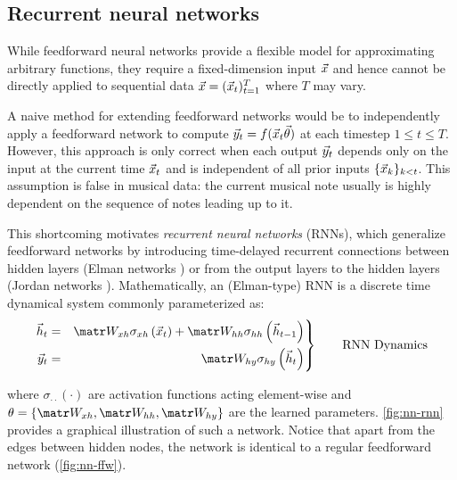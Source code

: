 \subsection{Recurrent neural networks}


While feedforward neural networks provide a flexible model for approximating
arbitrary functions, they require a fixed-dimension input $\vec{x}$ and hence
cannot be directly applied to sequential data $\vec{x} = (\vec{x}_t)_{t=1}^T$ where $T$ may
vary.

A naive method for extending feedforward networks would be to independently
apply a feedforward network to compute $\vec{y}_t = f(\vec{x}_t \vec{\theta})$ at each timestep
$1 \leq t \leq T$. However, this approach is only correct when each output
$\vec{y}_t$ depends only on the input at the current time $\vec{x}_t$ and is independent of
all prior inputs $\{\vec{x}_k\}_{k < t}$. This assumption is false in musical data:
the current musical note usually is highly dependent on the sequence of notes
leading up to it.

This shortcoming motivates \emph{recurrent neural networks} (RNNs), which
generalize feedforward networks by introducing time-delayed recurrent
connections between hidden layers (Elman networks \citep{elman1990finding}) or
from the output layers to the hidden layers (Jordan networks
\citep{jordan1997serial}). Mathematically, an (Elman-type) RNN is a discrete time
dynamical system commonly parameterized as:
\begin{equation}\label{eq:rnn-dynamics}
 \left.\begin{aligned}
          \h_t &=& \W_{xh} \sigma_{xh} \left( \x_t \right) + \W_{hh} \sigma_{hh} \left( \h_{t-1} \right)\\
          \y_t &=& \W_{hy} \sigma_{hy} \left( \h_t \right)
       \end{aligned}
 \right\}
 \qquad \text{RNN Dynamics}
\end{equation}
\begin{align}
\end{align}
where $\sigma_{\cdot \cdot}(\cdot)$ are activation functions acting
element-wise and $\theta = \{ \W_{xh}, \W_{hh}, \W_{hy}\}$ are the learned
parameters. \cref{fig:nn-rnn} provides a graphical illustration of such a
network. Notice that apart from the edges between hidden nodes, the network is
identical to a regular feedforward network (\cref{fig:nn-ffw}).


